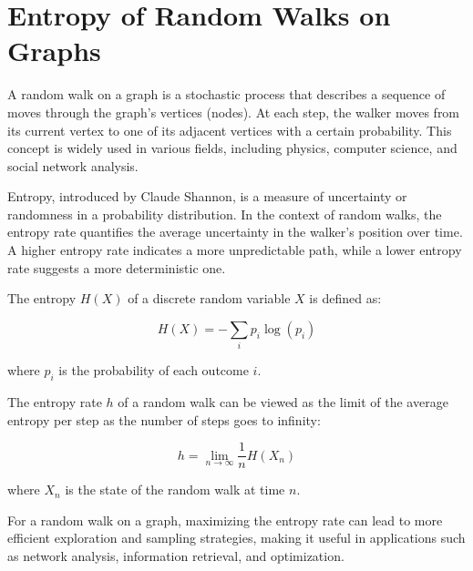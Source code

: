 \section{Entropy of Random Walks on Graphs}

A random walk on a graph is a stochastic process that describes a sequence of moves through the graph's vertices (nodes). At each step, the walker moves from its current vertex to one of its adjacent vertices with a certain probability. This concept is widely used in various fields, including physics, computer science, and social network analysis.


Entropy, introduced by Claude Shannon, is a measure of uncertainty or randomness in a probability distribution. In the context of random walks, the entropy rate quantifies the average uncertainty in the walker’s position over time. A higher entropy rate indicates a more unpredictable path, while a lower entropy rate suggests a more deterministic one.

The entropy \( H(X) \) of a discrete random variable \( X \) is defined as:

\[
H(X) = -\sum_{i} p_i \log(p_i)
\]

where \( p_i \) is the probability of each outcome \( i \).


The entropy rate \( h \) of a random walk can be viewed as the limit of the average entropy per step as the number of steps goes to infinity:

\[
h = \lim_{n \to \infty} \frac{1}{n} H(X_n)
\]

where \( X_n \) is the state of the random walk at time \( n \). 

For a random walk on a graph, maximizing the entropy rate can lead to more efficient exploration and sampling strategies, making it useful in applications such as network analysis, information retrieval, and optimization.


